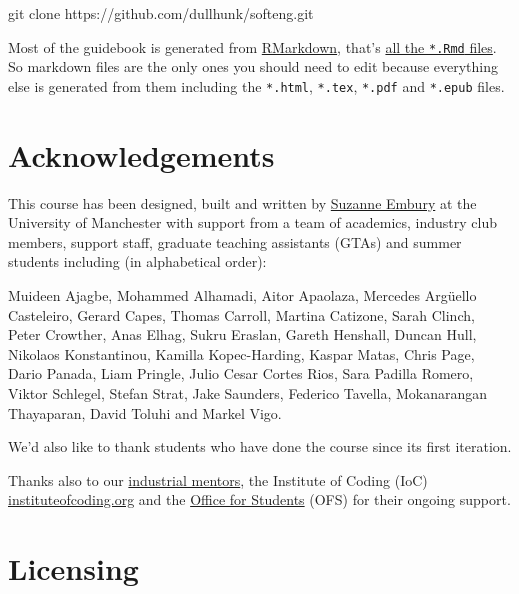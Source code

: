 \documentclass[
]{book}
\newenvironment{Shaded}{\begin{snugshade}}{\end{snugshade}}
\newcommand{\NormalTok}[1]{#1}
\begin{document}
\begin{Shaded}
\begin{Highlighting}[]
\NormalTok{git clone https://github.com/dullhunk/softeng.git}
\end{Highlighting}
\end{Shaded}

Most of the guidebook is generated from \href{https://en.wikipedia.org/wiki/Markdown}{RMarkdown}, that's \href{https://github.com/dullhunk/softeng/search?l=RMarkdown}{all the \texttt{*.Rmd} files}. So markdown files are the only ones you should need to edit because everything else is generated from them including the \texttt{*.html}, \texttt{*.tex}, \texttt{*.pdf} and \texttt{*.epub} files.

\hypertarget{teambury}{%
\section{Acknowledgements}\label{teambury}}

This course has been designed, built and written by \href{http://www.cs.man.ac.uk/~embury/}{Suzanne Embury} at the University of Manchester with support from a team of academics, industry club members, support staff, graduate teaching assistants (GTAs) and summer students including (in alphabetical order):

Muideen Ajagbe, Mohammed Alhamadi, Aitor Apaolaza, Mercedes Argüello Casteleiro, Gerard Capes, Thomas Carroll, Martina Catizone, Sarah Clinch, Peter Crowther, Anas Elhag, Sukru Eraslan, Gareth Henshall, Duncan Hull, Nikolaos Konstantinou, Kamilla Kopec-Harding, Kaspar Matas, Chris Page, Dario Panada, Liam Pringle, Julio Cesar Cortes Rios, Sara Padilla Romero, Viktor Schlegel, Stefan Strat, Jake Saunders, Federico Tavella, Mokanarangan Thayaparan, David Toluhi and Markel Vigo.

We'd also like to thank students who have done the course since its first iteration.

Thanks also to our \href{https://www.cs.manchester.ac.uk/connect/business-engagement/industrial-mentoring/}{industrial mentors}, the Institute of Coding (IoC) \href{https://instituteofcoding.org/}{instituteofcoding.org} and the \href{https://www.officeforstudents.org.uk/}{Office for Students} (OFS) for their ongoing support.

\hypertarget{license}{%
\section{Licensing}\label{license}}
\end{document}
